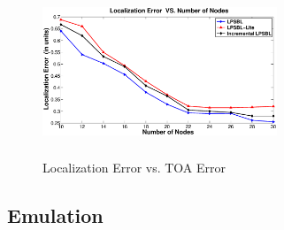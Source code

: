     \begin{figure}[htb]       
            \centering
			\vspace{-3mm}
            \includegraphics[height=5.0cm,width=7.0cm]{image/Incremental.eps}
                \caption{Localization Error vs. TOA Error}
             \vspace{-8mm}
             \label{Incremental}
        \end{figure}
		


  \subsection{Emulation}

